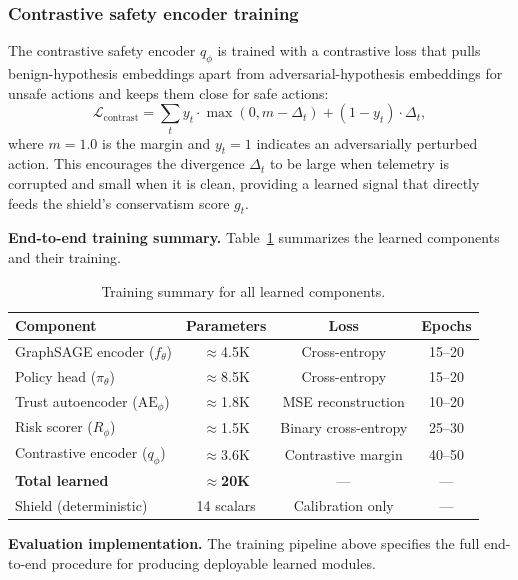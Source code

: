 \documentclass[10pt,journal,compsoc]{IEEEtran}
\begin{document}
\subsubsection{Contrastive safety encoder training}
The contrastive safety encoder $q_\phi$ is trained with a contrastive loss that pulls benign-hypothesis embeddings apart from adversarial-hypothesis embeddings for unsafe actions and keeps them close for safe actions:
\[
\mathcal{L}_{\mathrm{contrast}} = \sum_{t} y_t \cdot \max(0, m - \Delta_t) + (1-y_t) \cdot \Delta_t,
\]
where $m = 1.0$ is the margin and $y_t = 1$ indicates an adversarially perturbed action.
This encourages the divergence $\Delta_t$ to be large when telemetry is corrupted and small when it is clean, providing a learned signal that directly feeds the shield's conservatism score $g_t$.

\noindent\textbf{End-to-end training summary.}
Table~\ref{tab:training_summary} summarizes the learned components and their training.

\begin{table}[t]
\centering
\caption{Training summary for all learned components.}
\label{tab:training_summary}
\begin{tabular}{lccc}
\toprule
Component & Parameters & Loss & Epochs \\
\midrule
GraphSAGE encoder ($f_\theta$)     & $\approx$4.5K & Cross-entropy     & 15--20  \\
Policy head ($\pi_\theta$)          & $\approx$8.5K  & Cross-entropy     & 15--20  \\
Trust autoencoder ($\mathrm{AE}_\phi$) & $\approx$1.8K & MSE reconstruction & 10--20  \\
Risk scorer ($R_\phi$)              & $\approx$1.5K & Binary cross-entropy & 25--30 \\
Contrastive encoder ($q_\phi$)      & $\approx$3.6K  & Contrastive margin & 40--50 \\
\midrule
\textbf{Total learned}             & $\approx$\textbf{20K} & --- & --- \\
Shield (deterministic)              & 14 scalars   & Calibration only   & --- \\
\bottomrule
\end{tabular}
\end{table}

\noindent\textbf{Evaluation implementation.}
The training pipeline above specifies the full end-to-end procedure for producing deployable learned modules.
\end{document}
